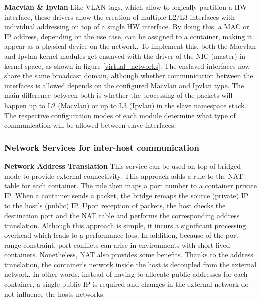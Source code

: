 \documentclass[conference]{IEEEtran}
\begin{document}
\noindent\textbf{Macvlan \& Ipvlan}\hspace{0.2cm} Like VLAN tags, which allow to logically partition a HW interface, these drivers allow the creation of multiple L2/L3 interfaces with individual addressing on top of a single HW interface. By doing this, a MAC or IP address, depending on the use case, can be assigned to a container, making it appear as a physical device on the network. To implement this, both the Macvlan and Ipvlan kernel modules get enslaved with the driver of the NIC (master) in kernel space, as shown in figure \ref{virtual_networks}. The enslaved interfaces now share the same broadcast domain, although whether communication between the interfaces is allowed depends on the configured Macvlan and Ipvlan type. The main difference between both is whether the processing of the packets will happen up to L2 (Macvlan) or up to L3 (Ipvlan) in the slave namespace stack. The respective configuration modes of each module determine what type of communication will be allowed between slave interfaces.
\subsubsection{Network Services for inter-host communication}\hfill\break
\textbf{Network Address Translation}\hspace{0.2cm} This service can be used on top of bridged mode to provide external connectivity. This approach adds a rule to the NAT table for each container. The rule then maps a port number to a container private IP. When a container sends a packet, the bridge remaps the source (private) IP to the host's (public) IP. Upon reception of packets, the host checks the destination port and the NAT table and performs the corresponding address translation. Although this approach is simple, it incurs a significant processing overhead which leads to a performance loss. In addition, because of the port range constraint, port-conflicts can arise in environments with short-lived containers. Nonetheless, NAT also provides some benefits. Thanks to the address translation, the container's network inside the host is decoupled from the external network. In other words, instead of having to allocate public addresses for each container, a single public IP is required and changes in the external network do not influence the hosts networks.
\end{document}
